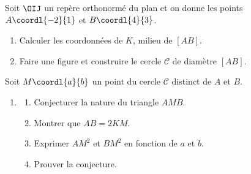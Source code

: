 \begin{exo}
	Soit $\OIJ$ un repère orthonormé du plan et on donne les points $A\coordl{-2}{1}$ et $B\coordl{4}{3}$.
	\begin{enumerate}
		\item Calculer les coordonnées de $K$, milieu de $[AB]$.
		\item Faire une figure et construire le cercle $\mathcal{C}$ de diamètre $[AB]$.
	\end{enumerate}

	Soit $M\coordl{a}{b}$ un point du cercle $\mathcal{C}$ distinct de $A$ et $B$.
	\begin{enumerate}[resume]
		\item\begin{enumerate}
			\item Conjecturer la nature du triangle $AMB$.
			\item Montrer que $AB = 2KM$.
			\item Exprimer $AM^2$ et $BM^2$ en fonction de $a$ et $b$.
			\item Prouver la conjecture.
		\end{enumerate}
	\end{enumerate}
\end{exo}
